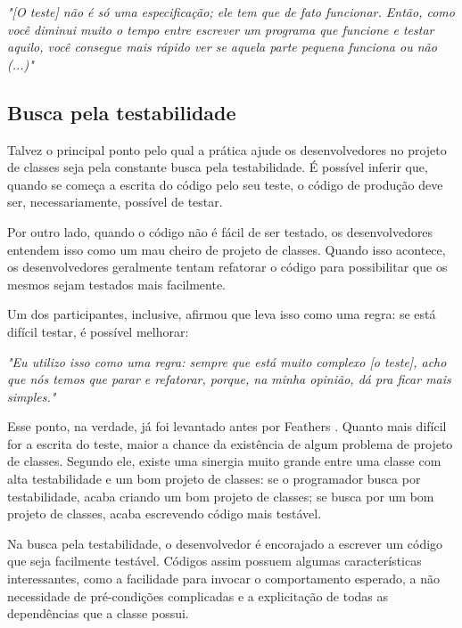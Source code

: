 \documentclass[conference]{IEEEtran}
\begin{document}
\begin{framed}
\textit{"[O teste] não é só uma especificação; ele tem que de fato funcionar. Então,
como você diminui muito o tempo entre escrever um programa que funcione e testar aquilo,
você consegue mais rápido ver se aquela parte pequena funciona ou não (...)"}
\end{framed}

\subsection{Busca pela testabilidade}

Talvez o principal ponto pelo qual a prática ajude os desenvolvedores no projeto de classes 
seja pela constante busca pela testabilidade. É possível inferir que, quando se 
começa a escrita do código pelo seu teste, o código de produção deve ser, necessariamente,
possível de testar.

Por outro lado, quando o código não é fácil de ser testado, os desenvolvedores
entendem isso como um mau cheiro de projeto de classes. Quando isso acontece,
os desenvolvedores geralmente tentam refatorar o código para possibilitar que
os mesmos sejam testados mais facilmente.

Um dos participantes, inclusive, afirmou que leva isso como uma regra:
se está difícil testar, é possível melhorar:

\begin{framed}
\textit{"Eu utilizo isso como uma regra: sempre que está muito complexo [o teste],
acho que nós temos que parar e refatorar, porque, na minha opinião, dá
pra ficar mais simples."}
\end{framed}

Esse ponto, na verdade, já foi levantado antes por Feathers \cite{feathers-synergy}.
Quanto mais difícil for a escrita do teste, maior a chance da existência de
algum problema de projeto de classes. Segundo ele, 
existe uma sinergia muito grande entre uma classe com alta testabilidade e um bom projeto de classes: 
se o programador busca por testabilidade, acaba criando um bom projeto de classes; se 
busca por um bom projeto de classes, acaba escrevendo código mais
testável.

Na busca pela testabilidade, o desenvolvedor é encorajado a escrever um
código que seja facilmente testável. Códigos assim possuem algumas
características interessantes, como a facilidade para invocar o comportamento
esperado, a não necessidade de pré-condições complicadas e a explicitação de
todas as dependências que a classe possui.
\end{document}
